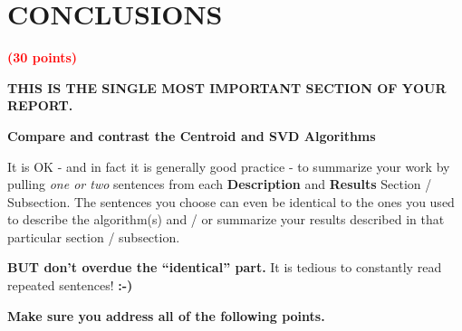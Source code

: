 \documentclass[dvipsnames,12pt]{article} %
\newcommand{\Nb}[1]{{\textcolor{NavyBlue}{#1}}}
\newcommand{\BNb}[1]{\textbf{\Nb{#1}}} %
\newcommand{\Brd}[1]{{\textbf{\textcolor{Red}{#1}}}}               %
\newcommand{\Brp}[1]{\textbf{\textcolor{RoyalPurple}{#1}}}         %
\newcommand{\Brm}[1]{\textbf{\textcolor[rgb]{0.69,0.19,0.38}{#1}}} %
\begin{document}
    \vspace*{12pt}

  \section{CONCLUSIONS}
    \label{SECT 06:CONCLUSIONS}

    \Brd{(30 points)}

    \vspace{06pt}

    \Brp{THIS IS THE SINGLE MOST IMPORTANT SECTION OF YOUR REPORT.}

    \vspace{06pt}

    \Brm{Compare and contrast the Centroid and SVD Algorithms}

    \vspace{06pt}

    It is OK - and in fact it is generally good practice - to summarize your work by pulling
    \textit{one or  two} sentences from each \Brp{Description} and \Brp{Results} Section /
    Subsection.
    The sentences you choose can even be identical to the ones you used to describe the
    algorithm(s) and / or summarize your results described in that particular
    section / subsection.

    \vspace{06pt}

    \Brm{BUT don't overdue the ``identical'' part.}  It is tedious to constantly read repeated
    sentences! \BNb{:-)}
    
    \vspace{06pt}

    \Brm{Make sure you address all of the following points.}
\end{document}
